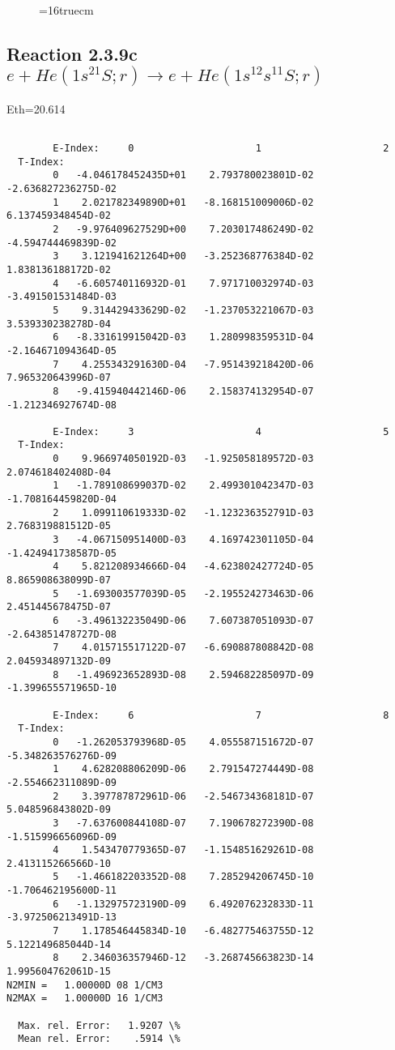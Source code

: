 \documentclass[12pt,dvipdfmx]{article}
\begin{document}
\begin{figure} \label{2.3.9b}
\epsfxsize=16truecm
\end{figure}
\newpage


\subsection{
Reaction 2.3.9c  $e + He(1s^21S;r) \rightarrow e + He(1s^12s^11S;r) $
}
Eth=20.614


\begin{small}\begin{verbatim}

        E-Index:     0                     1                     2
  T-Index:
        0   -4.046178452435D+01    2.793780023801D-02   -2.636827236275D-02
        1    2.021782349890D+01   -8.168151009006D-02    6.137459348454D-02
        2   -9.976409627529D+00    7.203017486249D-02   -4.594744469839D-02
        3    3.121941621264D+00   -3.252368776384D-02    1.838136188172D-02
        4   -6.605740116932D-01    7.971710032974D-03   -3.491501531484D-03
        5    9.314429433629D-02   -1.237053221067D-03    3.539330238278D-04
        6   -8.331619915042D-03    1.280998359531D-04   -2.164671094364D-05
        7    4.255343291630D-04   -7.951439218420D-06    7.965320643996D-07
        8   -9.415940442146D-06    2.158374132954D-07   -1.212346927674D-08

        E-Index:     3                     4                     5
  T-Index:
        0    9.966974050192D-03   -1.925058189572D-03    2.074618402408D-04
        1   -1.789108699037D-02    2.499301042347D-03   -1.708164459820D-04
        2    1.099110619333D-02   -1.123236352791D-03    2.768319881512D-05
        3   -4.067150951400D-03    4.169742301105D-04   -1.424941738587D-05
        4    5.821208934666D-04   -4.623802427724D-05    8.865908638099D-07
        5   -1.693003577039D-05   -2.195524273463D-06    2.451445678475D-07
        6   -3.496132235049D-06    7.607387051093D-07   -2.643851478727D-08
        7    4.015715517122D-07   -6.690887808842D-08    2.045934897132D-09
        8   -1.496923652893D-08    2.594682285097D-09   -1.399655571965D-10

        E-Index:     6                     7                     8
  T-Index:
        0   -1.262053793968D-05    4.055587151672D-07   -5.348263576276D-09
        1    4.628208806209D-06    2.791547274449D-08   -2.554662311089D-09
        2    3.397787872961D-06   -2.546734368181D-07    5.048596843802D-09
        3   -7.637600844108D-07    7.190678272390D-08   -1.515996656096D-09
        4    1.543470779365D-07   -1.154851629261D-08    2.413115266566D-10
        5   -1.466182203352D-08    7.285294206745D-10   -1.706462195600D-11
        6   -1.132975723190D-09    6.492076232833D-11   -3.972506213491D-13
        7    1.178546445834D-10   -6.482775463755D-12    5.122149685044D-14
        8    2.346036357946D-12   -3.268745663823D-14    1.995604762061D-15
N2MIN =   1.00000D 08 1/CM3
N2MAX =   1.00000D 16 1/CM3

  Max. rel. Error:   1.9207 \%
  Mean rel. Error:    .5914 \%



\end{verbatim}\end{small}
\end{document}
